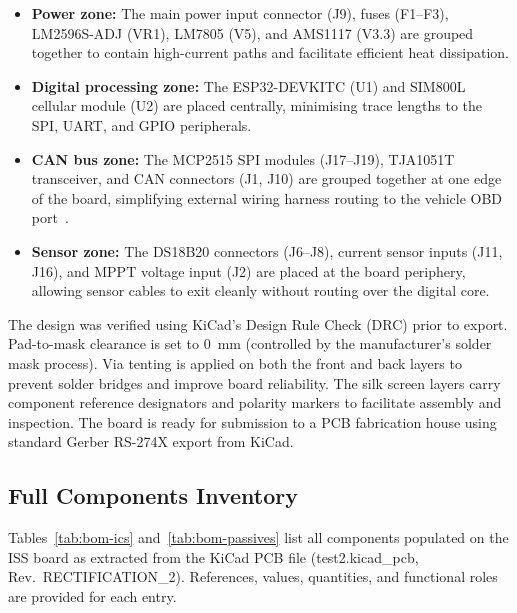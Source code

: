 \begin{itemize}
    \item \textbf{Power zone:} The main power input connector (J9), fuses (F1--F3), LM2596S-ADJ (VR1), LM7805 (V5), and AMS1117 (V3.3) are grouped together to contain high-current paths and facilitate efficient heat dissipation.
    \item \textbf{Digital processing zone:} The ESP32-DEVKITC (U1) and SIM800L cellular module (U2) are placed centrally, minimising trace lengths to the SPI, UART, and GPIO peripherals.
    \item \textbf{CAN bus zone:} The MCP2515 SPI modules (J17--J19), TJA1051T transceiver, and CAN connectors (J1, J10) are grouped together at one edge of the board, simplifying external wiring harness routing to the vehicle OBD port~\cite{bakowiring}.
    \item \textbf{Sensor zone:} The DS18B20 connectors (J6--J8), current sensor inputs (J11, J16), and MPPT voltage input (J2) are placed at the board periphery, allowing sensor cables to exit cleanly without routing over the digital core.
\end{itemize}

The design was verified using KiCad's Design Rule Check (DRC) prior to export. Pad-to-mask clearance is set to 0~mm (controlled by the manufacturer's solder mask process). Via tenting is applied on both the front and back layers to prevent solder bridges and improve board reliability. The silk screen layers carry component reference designators and polarity markers to facilitate assembly and inspection. The board is ready for submission to a PCB fabrication house using standard Gerber RS-274X export from KiCad.

\subsection{Full Components Inventory}
\label{sec:components-inventory}

Tables~\ref{tab:bom-ics} and~\ref{tab:bom-passives} list all components populated on the ISS board as extracted from the KiCad PCB file (test2.kicad\_pcb, Rev.~RECTIFICATION\_2). References, values, quantities, and functional roles are provided for each entry.

